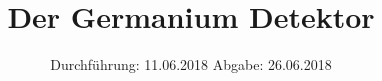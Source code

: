 

\subject{V18}
\title{\texorpdfstring{Der Germanium Detektor }{}}
\date{
	Durchführung: 11.06.2018
	\hspace{4em}
	Abgabe: 26.06.2018
}


	\maketitle
	\newpage
	\tableofcontents
	\newpage
	
	
	
	
	
	
	\newpage

	\printbibliography

